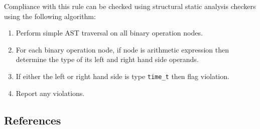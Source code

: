 Compliance with this rule can be checked using structural static analysis checkers using the following algorithm:

\begin{enumerate}
\item Perform simple AST traversal on all binary operation nodes.
\item For each binary operation node, if node is arithmetic expression then determine the type of its left and right hand side operands.
\item If either the left or right hand side is type {\tt time\_t} then flag violation.
\item Report any violations. 
\end{enumerate}

\subsection{References}

